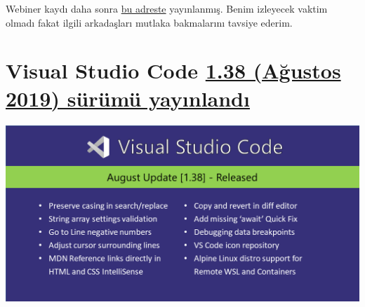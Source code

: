 \documentclass[11pt]{article}
\begin{document}
Webiner kaydı daha sonra \href{https://www.youtube.com/watch?v=60cAwGQ\_E7o}{bu adreste} yayınlanmış. Benim izleyecek vaktim olmadı
fakat ilgili arkadaşları mutlaka bakmalarını tavsiye ederim.
\section{Visual Studio Code \href{https://code.visualstudio.com/updates/v1\_38}{1.38 (Ağustos 2019) sürümü yayınlandı}}
\label{sec:org98c2d7c}
\begin{center}
\includegraphics[width=.9\linewidth]{gorseller/vscode1-38.png}
\end{center}
\end{document}
